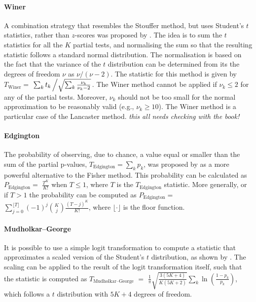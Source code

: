 \paragraph{Winer} A combination strategy that resembles the Stouffer method, but uses Student's $t$ statistics, rather than $z$-scores was proposed by \citet{Winer1962}. The idea is to sum the $t$ statistics for all the $K$ partial tests, and normalising the sum so that the resulting statistic follows a standard normal distribution. The normalisation is based on the fact that the variance of the $t$ distribution can be determined from its the degrees of freedom $\nu$ as $\nu/(\nu-2)$. The statistic for this method is given by $T_{\text{Winer}}=$ $\sum_{k}t_{k}\left/\sqrt{\sum_{k}\frac{\nu_{k}}{\nu_{k}-2}}\right.$. The Winer method cannot be applied if $\nu_{k} \leqslant 2$ for any of the partial tests. Moreover, $\nu_{k}$ should not be too small for the normal approximation to be reasonably valid (e.g., $\nu_{k} \geqslant 10$). The Winer method is a particular case of the Lancaster method. {\color{orange} \emph{this all needs checking with the book!}}

\paragraph{Edgington} The probability of observing, due to chance, a value equal or smaller than the sum of the partial p-values, $T_{\text{Edgington}}=\sum_{k} p_{k}$, was proposed by \citet{Edgington1972} as a more powerful alternative to the Fisher method. This probability can be calculated as $P_{\text{Edgington}} =$ $\frac{T^K}{K!}$ when $T \leqslant 1$, where $T$ is the $T_{\text{Edgington}}$ statistic. More generally, or if $T>1$ the probability can be computed as $P_{\text{Edgington}} =$ $\sum_{j=0}^{\lfloor T \rfloor}(-1)^j \binom{K}{j}\frac{(T-j)^K}{K!}$, where $\lfloor \cdot \rfloor$ is the floor function.

\paragraph{Mudholkar--George} It is possible to use a simple logit transformation to compute a statistic that approximates a scaled version of the Student's $t$ distribution, as shown by \citet{Mudholkar1979}. The scaling can be applied to the result of the logit transformation itself, such that the statistic is computed as $T_{\text{Mudholkar--George}}$ $=$ $\frac{1}{\pi}\sqrt{\frac{3(5K+4)}{K(5K+2)}}\sum_{k} \ln\left(\frac{1-p_{k}}{p_{k}}\right)$, which follows a $t$ distribution with $5K+4$ degrees of freedom.

